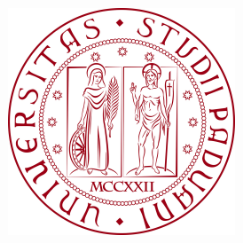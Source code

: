 \begin{titlepage}
    \begin{center}
        \begin{Large}
            \textbf{\myUni}\\
        \end{Large}

        \vspace{5pt}

        \begin{large}
            \textsc{\myDepartment}\\
        \end{large}

        \vspace{5pt}

        \begin{large}
            \textsc{\myFaculty}\\
        \end{large}

        \vspace{25pt}
        
        \begin{figure}[htbp]
            \centering
            \includegraphics[alt={Emblema dell'Università degli Studi di Padova}, height=6cm]{img/logo_unipd.jpeg}
        \end{figure}

        
        \begin{Large}
            \textbf{\myTitle}\\
        \end{Large}

        \vspace{5pt}

        \begin{large}
            \textit{\myDegree}\\
        \end{large}


\end{center}
\end{titlepage}
